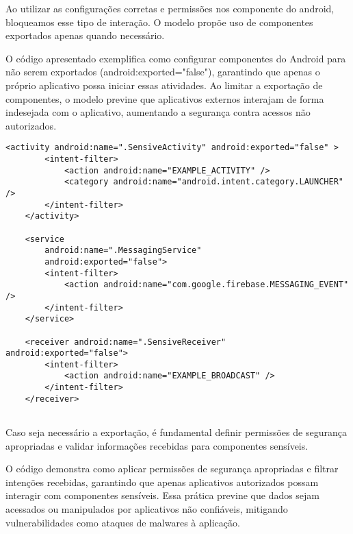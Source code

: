     Ao utilizar as configurações corretas e permissões nos componente do android, bloqueamos esse tipo de interação. O modelo propõe uso de componentes exportados apenas quando necessário. 

    O código apresentado exemplifica como configurar componentes do Android para não serem exportados (android:exported="false"), garantindo que apenas o próprio aplicativo possa iniciar essas atividades. Ao limitar a exportação de componentes, o modelo previne que aplicativos externos interajam de forma indesejada com o aplicativo, aumentando a segurança contra acessos não autorizados.
    \\

    \begin{scriptsize}
    \estiloJava
    \begin{lstlisting}[caption={Componentes exportados}, label=lst:javacode]
    <activity android:name=".SensiveActivity" android:exported="false" >
        <intent-filter>
            <action android:name="EXAMPLE_ACTIVITY" />
            <category android:name="android.intent.category.LAUNCHER" />
        </intent-filter>
    </activity>

    <service
        android:name=".MessagingService"
        android:exported="false">
        <intent-filter>
            <action android:name="com.google.firebase.MESSAGING_EVENT" />
        </intent-filter>
    </service>

    <receiver android:name=".SensiveReceiver" android:exported="false">
        <intent-filter>
            <action android:name="EXAMPLE_BROADCAST" />
        </intent-filter>
    </receiver>
    
    \end{lstlisting}
    \end{scriptsize}


    Caso seja necessário a exportação, é fundamental definir permissões de segurança apropriadas e validar informações recebidas para componentes sensíveis. 

    O código demonstra como aplicar permissões de segurança apropriadas e filtrar intenções recebidas, garantindo que apenas aplicativos autorizados possam interagir com componentes sensíveis. Essa prática previne que dados sejam acessados ou manipulados por aplicativos não confiáveis, mitigando vulnerabilidades como ataques de malwares à aplicação.
    \\

